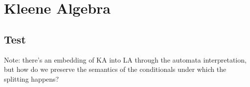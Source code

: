\section{Kleene Algebra}

\subsection{Test}

Note: there's an embedding of KA into LA through the automata interpretation,
but how do we preserve the semantics of the conditionals under which
the splitting happens?

